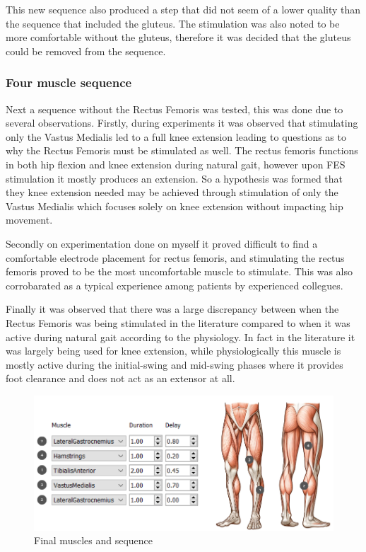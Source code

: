 This new sequence also produced a step that did not seem of a lower quality than the sequence that included the gluteus. The stimulation was also noted to be more comfortable without the gluteus, therefore it was decided that the gluteus could be removed from the sequence.



\subsubsection{Four muscle sequence}
Next a sequence without the Rectus Femoris was tested, this was done due to several observations. Firstly, during experiments it was observed that stimulating only the Vastus Medialis led to a full knee extension leading to questions as to why the Rectus Femoris must be stimulated as well. The rectus femoris functions in both hip flexion and knee extension during natural gait, however upon FES stimulation it mostly produces an extension. So a hypothesis was formed that they knee extension needed may be achieved through stimulation of only the Vastus Medialis which focuses solely on knee extension without impacting hip movement. 

Secondly on experimentation done on myself it proved difficult to find a comfortable electrode placement for rectus femoris, and stimulating the rectus femoris proved to be the most uncomfortable muscle to stimulate. This was also corrobarated as a typical experience among patients by experienced collegues. 

Finally it was observed that there was a large discrepancy between when the Rectus Femoris was being stimulated in the literature compared to when it was active during natural gait according to the physiology. In fact in the literature it was largely being used for knee extension, while physiologically this muscle is mostly active during the initial-swing and mid-swing phases where it provides foot clearance and does not act as an extensor at all. 

\begin{figure} [h]
    \centering
    \includegraphics[width=0.99\linewidth]{images/final_seq_w_muscles.png}
    \caption{Final muscles and sequence}
    \label{fig:fianlsequence}
\end{figure}

